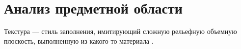 \chapter{Анализ предметной области}

Текстура --- стиль заполнения, имитирующий сложную рельефную объемную плоскость, выполненную из какого-то материала \cite{Porev}.

